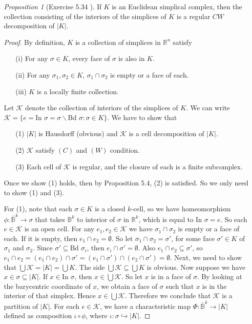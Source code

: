 \documentclass[a4paper]{article}
\theoremstyle{remark}
\newtheorem{prop}{Proposition}
\newcommand{\rn}{\mathbb{R}^n} %
\newcommand{\rk}{\mathbb{R}^k} %
\newcommand{\openball}{\mathbb{B}} %
\newcommand{\closedball}{\bar{\mathbb{B}}} %
\newcommand{\subhim}{\subseteq} %
\newcommand{\In}{\text{In }} %
\newcommand{\Bd}{\text{Bd }} %
\begin{document}
\begin{prop}[Exercise 5.34 \cite{LeeTM}]
	If $K$ is an Euclidean simplical complex, then the collection consisting of the interiors of the simplices of $K$ is a regular $CW$ decomposition of $|K|$. 
\end{prop}
\begin{proof}
	By definition, $K$ is a collection of simplices in $\rn$ satisfy
	\begin{enumerate}[nolistsep]
		\item [(i)] For any $\sigma \in K$, every face of $\sigma$ is also in $K$.
		\item [(ii)] For any $\sigma_1,\sigma_2 \in K$, $\sigma_1 \cap \sigma_2$ is empty or a face of each.
		\item [(iii)] $K$ is a locally finite collection.
	\end{enumerate}
    Let $\mathcal{K}$ denote the collection of interiors of the simplices of $K$. We can write $\mathcal{K} = \{e = \In \sigma = \sigma \smallsetminus \Bd \sigma : \sigma \in K \}$. We have to show that 
    \begin{enumerate}[nolistsep]
    	\item [(1)] $|K|$ is Hausdorff (obvious) and $\mathcal{K}$ is a cell decomposition of $|K|$.
    	\item [(2)] $\mathcal{K}$ satisfy $(C)$ and $(W)$ condition.
    	\item [(3)] Each cell of $\mathcal{K}$ is regular, and the closure of each is a finite subcomplex.
    \end{enumerate}
    Once we show (1) holds, then by Proposition 5.4, (2) is satisfied. So we only need to show (1) and (3). 
    
    For (1), note that each $\sigma \in K$ is a closed $k$-cell, so we have homeomorphism $\phi : \closedball^k \to \sigma$ that takes $\openball^k$ to interior of $\sigma$ in $\rk$, which is equal to $\In \sigma = e$. So each $e \in \mathcal{K}$ is an open cell. For any $e_1,e_2 \in \mathcal{K}$ we have $\sigma_1 \cap \sigma_2 $ is empty or a face of each. If it is empty, then $e_1 \cap e_2= \emptyset$. So let $\sigma_1 \cap \sigma_2 = \sigma'$, for some face $\sigma' \in K$ of $\sigma_1$ and $\sigma_2$. Since $\sigma' \subhim \Bd \sigma_i$, then $e_i \cap \sigma' = \emptyset$. Also $e_1 \cap e_2 \subhim \sigma'$, so $e_1 \cap e_2  = (e_1 \cap e_2 )\cap \sigma' = (e_1 \cap \sigma') \cap (e_2 \cap \sigma') = \emptyset$. Next, we need to show that $\bigcup \mathcal{K} = |K| = \bigcup K$. The side $\bigcup \mathcal{K} \subhim \bigcup K$ is obvious. Now suppose we have $x \in \sigma \subhim |K|$. If $x \in \In \sigma$, then $x \in \bigcup \mathcal{K}$. So let $x $ is in a face of $\sigma$. By looking at the barycentric coordinate of $x$, we obtain a face of $\sigma$ such that $x$ is in the interior of that simplex. Hence $x \in \bigcup \mathcal{K}$. Therefore we conclude that $\mathcal{K}$ is a partition of $|K|$. For each $e \in \mathcal{K}$, we have a characteristic map $\Phi : \closedball^k \to |K|$ defined as composition $\iota \circ \phi$, where $\iota : \sigma \hookrightarrow |K|$.
    

\end{proof}
\end{document}
